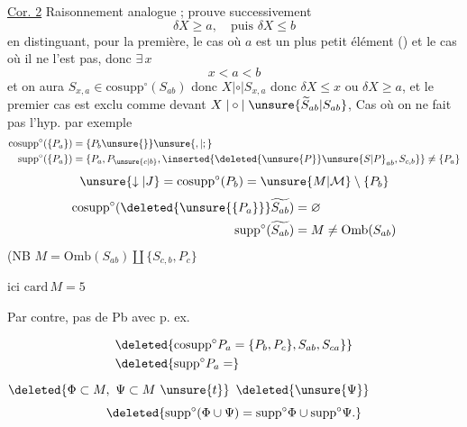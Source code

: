 \uline{Cor. 2} Raisonnement analogue ;    prouve successivement
\[
 \delta X\geq a,\quad\text{puis }\delta X\leq b
\]
en distinguant, pour la première, le cas où $a$ est un plus petit élément () et le cas où il ne l'est pas, donc $\exists\,x$
\[
 x<a<b
\]
et on aura $S_{x,a}\in\mathrm{cosupp}^{\circ}(S_{ab})$ donc $X\mathrel{|\circ|}S_{x,a}$ donc $\delta X\leq x$ ou $\delta X\geq a$, et le premier cas est exclu comme devant  $X\mathrel{|\circ|}\unsure{\widetilde S_{ab}|S_{ab}}$, 
Cas où on ne fait pas l'hyp. par exemple
\[
\begin{aligned}
 \mathrm{cosupp}^{\circ}(\{P_a\})&=\{P_b\unsure{\}}\unsure{,|;}\\
 \mathrm{supp}^{\circ}(\{P_a\})&=\{P_a,P_{\unsure{c|b}},\inserted{\deleted{\unsure{P}}\unsure{S|P}_{ab},S_{c,b}}\}\ne\{P_a\}
\end{aligned}
\]
\[
 \unsure{\downarrow|J}=\mathrm{cosupp}^{\circ}(P_b)=\unsure{M|\mathcal M}\setminus\{P_b\}
\]
\[
\begin{aligned}
 \mathrm{cosupp}^{\circ}(\deleted{\unsure{\{P_a\}}}\widetilde{S_{ab}})&=\varnothing\\
 \mathrm{supp}^{\circ}(\widetilde{S_{ab}})&=M\ne\mathrm{Omb}(S_{ab})
\end{aligned}
\]
(NB $M=\mathrm{Omb}(S_{ab})\amalg\{S_{c,b},P_c\}$

ici $\mathrm{card}\,M=5$

Par contre, pas de Pb avec
p. ex.

\[
\begin{aligned}
 &\deleted{\mathrm{cosupp}^{\circ}P_a=\{P_b,P_c\},S_{ab},S_{ca}\}}\\
 &\deleted{\mathrm{supp}^{\circ}P_a=}
\end{aligned}
\]
 $\deleted{\Phi\subset M,\ \Psi\subset M\ \unsure{t}}$  $\deleted{\unsure{\Psi}}$ 
\[
 \deleted{\mathrm{supp}^{\circ}(\Phi\cup\Psi)=\mathrm{supp}^{\circ}\Phi\cup\mathrm{supp}^{\circ}\Psi.}
\]

